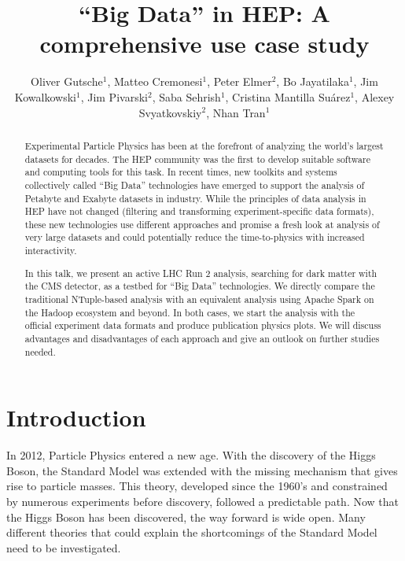 \documentclass[a4paper]{jpconf}
\begin{document}
\title{“Big Data” in HEP: A comprehensive use case study}

\author{Oliver Gutsche$^1$, Matteo Cremonesi$^1$, Peter Elmer$^2$, Bo Jayatilaka$^1$, Jim Kowalkowski$^1$, Jim Pivarski$^2$, Saba Sehrish$^1$, Cristina Mantilla Suárez$^1$, Alexey Svyatkovskiy$^2$, Nhan Tran$^1$}

\address{$^1$Fermi National Accelerator Laboratory, Batavia, IL, USA}
\address{$^2$Princeton University, Princeton, NJ, USA}


\begin{abstract}
Experimental Particle Physics has been at the forefront of analyzing the world’s largest datasets for decades. The HEP community was the first to develop suitable software and computing tools for this task. In recent times, new toolkits and systems collectively called “Big Data” technologies have emerged to support the analysis of Petabyte and Exabyte datasets in industry. While the principles of data analysis in HEP have not changed (filtering and transforming experiment-specific data formats), these new technologies use different approaches and promise a fresh look at analysis of very large datasets and could potentially reduce the time-to-physics with increased interactivity.
%

In this talk, we present an active LHC Run 2 analysis, searching for dark matter with the CMS detector, as a testbed for “Big Data” technologies. We directly compare the traditional NTuple-based analysis with an equivalent analysis using Apache Spark on the Hadoop ecosystem and beyond. In both cases, we start the analysis with the official experiment data formats and produce publication physics plots. We will discuss advantages and disadvantages of each approach and give an outlook on further studies needed.
\end{abstract}

\section{Introduction}

In 2012, Particle Physics entered a new age. With the discovery of the Higgs Boson, the Standard Model was extended with the missing mechanism that gives rise to particle masses. This theory, developed since the 1960's and constrained by numerous experiments before discovery, followed a predictable path. Now that the Higgs Boson has been discovered, the way forward is wide open. Many different theories that could explain the shortcomings of the Standard Model need to be investigated.
\end{document}
